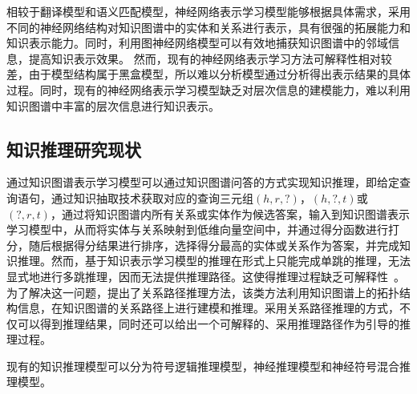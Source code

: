 \documentclass[algorithmlist, AutoFakeBold, AutoFakeSlant, figurelist, tablelist, nomlist, engineering, openany]{seuthesix} %
\begin{document}
相较于翻译模型和语义匹配模型，神经网络表示学习模型能够根据具体需求，采用不同的神经网络结构对知识图谱中的实体和关系进行表示，具有很强的拓展能力和知识表示能力。同时，利用图神经网络模型可以有效地捕获知识图谱中的邻域信息，提高知识表示效果。
然而，现有的神经网络表示学习方法可解释性相对较差，由于模型结构属于黑盒模型，所以难以分析模型通过分析得出表示结果的具体过程。同时，现有的神经网络表示学习模型缺乏对层次信息的建模能力，难以利用知识图谱中丰富的层次信息进行知识表示。

\subsection{知识推理研究现状}
通过知识图谱表示学习模型可以通过知识图谱问答的方式实现知识推理，即给定查询语句，通过知识抽取技术获取对应的查询三元组$\left(h, r, ?\right)$，$\left(h, ?, t\right)$或$\left(?, r, t\right)$，通过将知识图谱内所有关系或实体作为候选答案，输入到知识图谱表示学习模型中，从而将实体与关系映射到低维向量空间中，并通过得分函数进行打分，随后根据得分结果进行排序，选择得分最高的实体或关系作为答案，并完成知识推理。然而，基于知识表示学习模型的推理在形式上只能完成单跳的推理，无法显式地进行多跳推理，因而无法提供推理路径。这使得推理过程缺乏可解释性~\cite{wang2019deeppath}。为了解决这一问题，提出了关系路径推理方法，该类方法利用知识图谱上的拓扑结构信息，在知识图谱的关系路径上进行建模和推理。采用关系路径推理的方式，不仅可以得到推理结果，同时还可以给出一个可解释的、采用推理路径作为引导的推理过程。

现有的知识推理模型可以分为符号逻辑推理模型，神经推理模型和神经符号混合推理模型。


\end{document}
